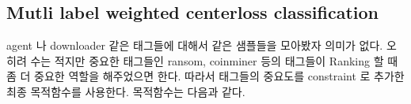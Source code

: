

\subsection{Mutli label weighted centerloss classification}
agent 나 downloader 같은 태그들에 대해서 같은 샘플들을 모아봤자 의미가 없다. 오히려 수는 적지만 중요한 태그들인 ransom, coinminer 등의 태그들이 Ranking 할 때 좀 더 중요한 역할을 해주었으면 한다. 따라서 태그들의 중요도를 constraint 로 추가한 최종 목적함수를 사용한다. 목적함수는 다음과 같다.  

